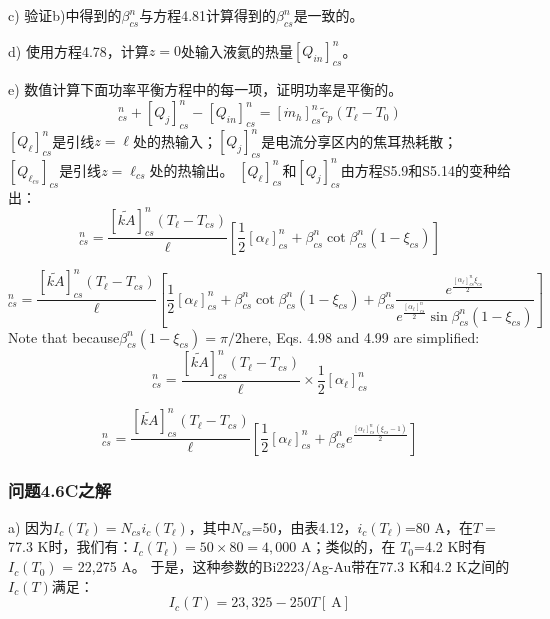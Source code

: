 c) 验证b)中得到的$\beta_{cs}^n$与方程4.81计算得到的$\beta_{cs}^n$是一致的。 

d) 使用方程4.78，计算$z=0$处输入液氦的热量$[Q_{in}]^n_{cs}$。

e) 数值计算下面功率平衡方程中的每一项，证明功率是平衡的。
\begin{equation}%
[Q_\ell]_{cs}^{n}+[Q_j]_{cs}^{n}-[Q_{in}]_{cs}^{n}=[\dot{m}_h]_{cs}^{n}\tilde{c}_p(T_\ell-T_0)
\end{equation}
$[Q_\ell]_{cs}^{n}$是引线$z=\ell$处的热输入；$[Q_j]_{cs}^{n}$是电流分享区内的焦耳热耗散；
$[Q_{\ell_{cs}}]_{cs}$是引线$z=\ell_{cs}$处的热输出。
$[Q_\ell]_{cs}^{n}$和$[Q_j]_{cs}^{n}$由方程S5.9和S5.14的变种给出：
\begin{equation}%
[Q_\ell]_{cs}^{n}=\frac{[\tilde{kA}]_{cs}^{n}(T_\ell-T_{cs})}{\ell}[\frac{1}{2}[\alpha_\ell]_{cs}^{n}+\beta_{cs}^{n}\cot\beta_{cs}^{n}(1-\xi_{cs})]
\end{equation}

\begin{equation}%
[Q_j]_{cs}^{n}=\frac{[\tilde{kA}]_{cs}^{n}(T_\ell-T_{cs})}{\ell}\left[\frac{1}{2}[\alpha_\ell]_{cs}^{n}+\beta_{cs}^{n}\cot\beta_{cs}^{n}(1-\xi_{cs}) 
+\beta_{cs}^{n}\frac{e^{\frac{[\alpha_\ell]_{cs}^{n}\xi_{cs}}{2}}}{e^{\frac{[\alpha_\ell]_{cs}^{n}}{2}}\sin\beta_{cs}^{n}(1-\xi_{cs})}\right]
\end{equation}
Note that because$\beta_{cs}^n (1-\xi_{cs})=\pi/2$here, Eqs. 4.98 and 4.99 are simplified:
\begin{equation}%
[Q_\ell]_{cs}^{n}=\frac{[\tilde{kA}]_{cs}^{n}(T_\ell-T_{cs})}{\ell}\times\frac{1}{2}[\alpha_\ell]_{cs}^{n}
\end{equation}

\begin{equation}%
[Q_j]_{cs}^{n}=\frac{[\tilde{kA}]_{cs}^{n}(T_\ell-T_{cs})}{\ell}\left[\frac{1}{2}[\alpha_\ell]_{cs}^{n}+\beta_{cs}^{n}e^{\frac{[\alpha_\ell]_{cs}^{n}(\xi_{cs}-1)}{2}}\right]
\end{equation}

\subsubsection{问题4.6C之解}
a) 因为$I_c(T_\ell)=N_{cs}i_c(T_\ell)$，其中$N_{cs}$=50，由表4.12，$i_c(T_\ell)$=80 A，在$T=$77.3 K时，我们有：$I_c(T_\ell)= 50\times 80= 4,000$ A；类似的，在
$T_0$=4.2 K时有$I_c(T_0)$ = 22,275 A。
于是，这种参数的Bi2223/Ag-Au带在77.3 K和4.2 K之间的$I_c(T)$满足：
\begin{equation}
 I_c(T)=23,325-250T[\ \mathrm{A}]
\end{equation}

